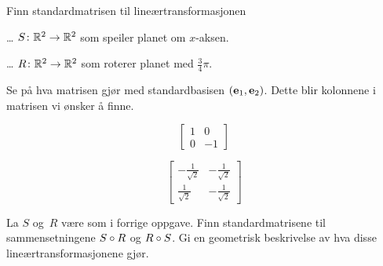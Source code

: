 \begin{oppgave}
Finn standardmatrisen til lineærtransformasjonen
\begin{punkt}
\ldots{} $S \colon \mathbb{R}^2 \to \mathbb{R}^2$ som
speiler planet om $x$-aksen.
\end{punkt}
\begin{punkt}
\ldots{} $R \colon \mathbb{R}^2 \to \mathbb{R}^2$ som
roterer planet med $\frac{3}{4}\pi$.
\end{punkt}
\end{oppgave}

\begin{losning}
Se på hva matrisen gjør med standardbasisen $(\mathbf{e}_1, \mathbf{e}_2)$. Dette blir
kolonnene i matrisen vi ønsker å finne.
\begin{punkt}
\[
\begin{bmatrix}
1 & 0\\
0 & -1
\end{bmatrix}
\]
\end{punkt}

\begin{punkt}
\[
\begin{bmatrix}
-\frac{1}{\sqrt{2}} & -\frac{1}{\sqrt{2}} \\
\frac{1}{\sqrt{2}}  & -\frac{1}{\sqrt{2}} 
\end{bmatrix}
\]
\end{punkt}


\end{losning}


\begin{oppgave}
La $S$ og~$R$ være som i forrige oppgave.  Finn standardmatrisene til
sammensetningene $S \circ R$ og $R \circ S$.  Gi en geometrisk
beskrivelse av hva disse lineærtransformasjonene gjør.
\end{oppgave}

